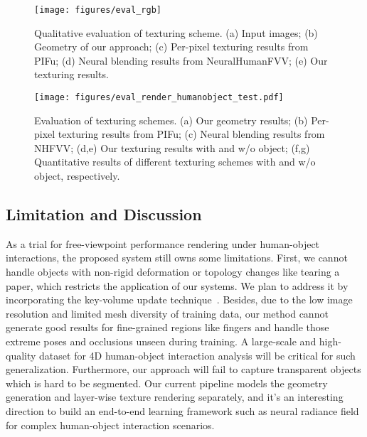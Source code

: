 \begin{figure}[t]
	\centering
	\texttt{[image: figures/eval\_rgb]}
	\caption{Qualitative evaluation of texturing scheme. (a) Input images; (b) Geometry of our approach; (c) Per-pixel texturing results from PIFu; (d) Neural blending results from NeuralHumanFVV; (e) Our texturing results. }
	\label{fig:eval_rgb}
\end{figure}


\begin{figure}[t]
	\centering
	\texttt{[image: figures/eval\_render\_humanobject\_test.pdf]}
	\vspace{-20pt}
	\caption{Evaluation of texturing schemes. (a) Our geometry results; (b) Per-pixel texturing results from PIFu; (c) Neural blending results from NHFVV; (d,e) Our texturing results with and w/o object; (f,g) Quantitative results of different texturing schemes with and w/o object, respectively.}
	\label{fig:eval_curve}
	\vspace{-10pt}
\end{figure}

\subsection{Limitation and Discussion} 
As a trial for free-viewpoint performance rendering under human-object interactions, the proposed system still owns some limitations.
First, we cannot handle objects with non-rigid deformation or topology changes like tearing a paper, which restricts the application of our systems.
%
We plan to address it by incorporating the key-volume update technique~\cite{FlyFusion}.
Besides, due to the low image resolution and limited mesh diversity of training data, our method cannot generate good results for fine-grained regions like fingers and handle those extreme poses and occlusions unseen during training. 
%
A large-scale and high-quality dataset for 4D human-object interaction analysis will be critical for such generalization.
Furthermore, our approach will fail to capture transparent objects which is hard to be segmented.
Our current pipeline models the geometry generation and layer-wise texture rendering separately, and it's an interesting direction to build an end-to-end learning framework such as neural radiance field~\cite{nerf} for complex human-object interaction scenarios.





